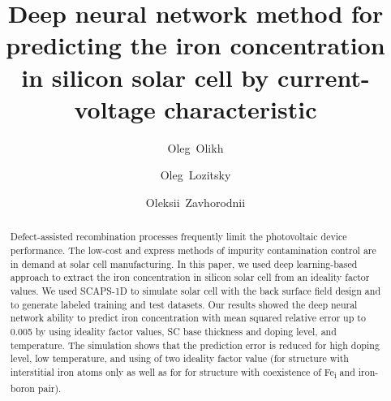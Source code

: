 \documentclass[a4paper,fleqn]{cas-sc}
\begin{document}
\let\WriteBookmarks\relax
\def\floatpagepagefraction{1}
\def\textpagefraction{.001}

\title [mode = title]{Deep neural network method for predicting the iron concentration in silicon solar cell by current-voltage characteristic}


\author[1]{Oleg~Olikh}
\cormark[1]


\address[1]{Taras Shevchenko National University of Kyiv, 64/13, Volodymyrska Street, City of Kyiv, Ukraine, 01601}

\author[1]{Oleg~Lozitsky}


\author[1]{Oleksii~Zavhorodnii}




\begin{abstract}

Defect-assisted recombination processes frequently
limit the photovoltaic device performance.
The low-cost and express methods of impurity contamination control
are in demand at solar cell manufacturing.
In this paper, we used deep learning-based
approach to extract the iron concentration in silicon solar cell from an  
ideality factor values.
We used SCAPS-1D to simulate solar cell with the back surface field design 
and to generate labeled training and test datasets.
Our results showed the deep neural network ability  
to predict iron concentration with mean squared relative error up to 0.005 by using ideality factor values, SC base thickness and doping level, and temperature.
The simulation shows that the prediction error 
is reduced for high doping level, low temperature, and using of two ideality factor value (for structure with interstitial iron atoms only as well as for for structure with
coexistence of Fe\textsubscript{i} and iron-boron pair).

%
\end{abstract}
\end{document}
